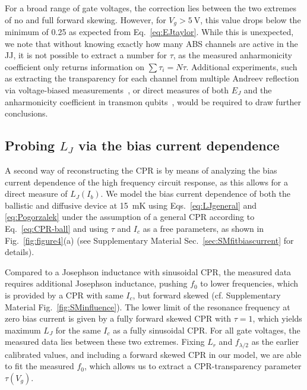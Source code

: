 For a broad range of gate voltages, the correction lies between the two extremes of no and full forward skewing.
%
However, for $V_g>\SI{5}{\volt}$, this value drops below the minimum of 0.25 as expected from Eq.~\ref{eq:EJtaylor}.
%
While this is unexpected, we note that without knowing exactly how many ABS channels are active in the JJ, it is not possible to extract a number for $\tau$, as the measured anharmonicity coefficient only returns information on $\sum\tau_i=N\tau$.
%
Additional experiments, such as extracting the transparency for each channel from multiple Andreev reflection via voltage-biased measurements~\cite{scheerConductionChannelTransmissions1997,goffmanConductionChannelsInAsAl2017,bretheauTunnellingSpectroscopyAndreev2017a,pandeyAndreevReflectionBallistic2019}, or direct measures of both $E_J$ and the anharmonicity coefficient in transmon qubits~\cite{larsenSemiconductorNanowireBasedSuperconductingQubit2015, delangeRealizationMicrowaveQuantum2015, casparisGatemonBenchmarkingTwoQubit2016a,casparisSuperconductingGatemonQubit2018}, would be required to draw further conclusions.


\subsection{Probing $L_J$ via the bias current dependence}

A second way of reconstructing the CPR is by means of analyzing the bias current dependence of the high frequency circuit response, as this allows for a direct measure of $L_J(I_b)$.
%
We model the bias current dependence of both the ballistic and diffusive device at \SI{15}{\milli\kelvin} using Eqs.~\ref{eq:LJgeneral} and \ref{eq:Pogorzalek} under the assumption of a general CPR according to Eq.~\ref{eq:CPR-ball} and using $\tau$ and $I_c$ as a free parameters, as shown in Fig.~\ref{fig:figure4}(a) (see Supplementary Material Sec.~\ref{sec:SMfitbiascurrent} for details).

Compared to a Josephson inductance with sinusoidal CPR, the measured data requires additional Josephson inductance, pushing $f_0$ to lower frequencies, which is provided by a CPR with same $I_c$, but forward skewed (cf. Supplementary Material Fig.~\ref{fig:SMinfluence}).
%
The lower limit of the resonance frequency at zero bias current is given by a fully forward skewed CPR with $\tau=1$, which yields maximum $L_J$ for the same $I_c$ as a fully sinusoidal CPR.
%
For all gate voltages, the measured data lies between these two extremes.
%
Fixing $L_r$ and $f_{\lambda/2}$ as the earlier calibrated values, and including a forward skewed CPR in our model, we are able to fit the measured $f_0$, which allows us to extract a CPR-transparency parameter $\tau(V_g)$.

